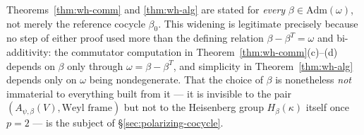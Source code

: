\begin{remark}
Theorems~\ref{thm:wh-comm} and \ref{thm:wh-alg} are stated for \emph{every}
$\beta\in\mathrm{Adm}(\omega)$, not merely the reference cocycle $\beta_0$.
This widening is legitimate precisely because no step of either proof used
more than the defining relation $\beta-\beta^T=\omega$ and bi-additivity: the
commutator computation in Theorem~\ref{thm:wh-comm}(c)--(d) depends on
$\beta$ only through $\omega=\beta-\beta^T$, and simplicity in
Theorem~\ref{thm:wh-alg} depends only on $\omega$ being nondegenerate. That
the choice of $\beta$ is nonetheless \emph{not} immaterial to everything
built from it — it is invisible to the pair $(A_{\psi,\beta}(V),\text{Weyl
frame})$ but not to the Heisenberg group $H_\beta(\kappa)$ itself once
$p=2$ — is the subject of \S\ref{sec:polarizing-cocycle}.
\end{remark}
